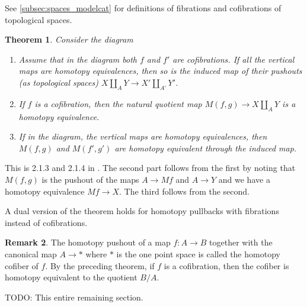 \documentclass{scrartcl}
\theoremstyle{plain}
\newtheorem{theorem}{Theorem}[section]
\theoremstyle{definition}
\newtheorem{remark}[theorem]{Remark}
\renewcommand{\coprod}{\mathbin{\amalg}}
\begin{document}
See \ref{subsec:spaces_modelcat} for definitions of fibrations and cofibrations of topological spaces.
\begin{theorem}
    Consider the diagram

    \begin{center}
    \end{center}

    \begin{enumerate}
    \item Assume that in the diagram 
    both $f$ and $f'$ are cofibrations. If all the vertical maps are homotopy equivalences, then so is the induced map of their pushouts (as topological spaces) $X\coprod_A Y \to X'\coprod_{A'} Y'$.
    \item If $f$ is a cofibration, then the natural quotient map $M(f,g)\to X\coprod_A Y$ is a homotopy equivalence.
    \item If in the diagram, the vertical maps are homotopy equivalences, then $M(f, g)$ and $M(f', g')$ are homotopy equivalent through the induced map.
    \end{enumerate}
\end{theorem}
This is 2.1.3 and 2.1.4 in \cite{may2011more}. The second part follows from the first by noting that $M(f, g)$ is the pushout of the maps $A\to Mf$ and $A\to Y$ and we have a homotopy equivalence $Mf \to X$. The third follows from the second.

A dual version of the theorem holds for homotopy pullbacks with fibrations instead of cofibrations.

\begin{remark}
    The homotopy pushout of a map $f\colon A\to B$ together with the canonical map $A\to *$ where $*$ is the one point space is called the homotopy cofiber of $f$. By the preceding theorem, if $f$ is a cofibration, then the cofiber is homotopy equivalent to the quotient $B/A$.
\end{remark}


TODO: This entire remaining section.
\end{document}
